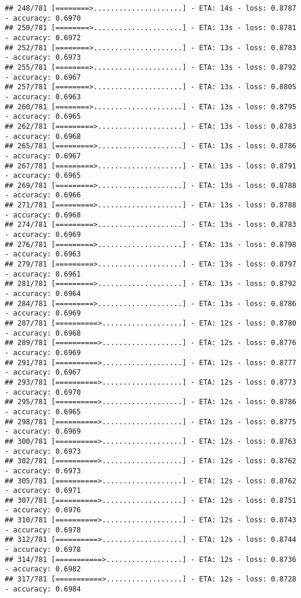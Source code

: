 \documentclass[
]{article}
\begin{document}
\begin{verbatim}
## 248/781 [========>.....................] - ETA: 14s - loss: 0.8787 - accuracy: 0.6970
## 250/781 [========>.....................] - ETA: 13s - loss: 0.8781 - accuracy: 0.6972
## 252/781 [========>.....................] - ETA: 13s - loss: 0.8783 - accuracy: 0.6973
## 255/781 [========>.....................] - ETA: 13s - loss: 0.8792 - accuracy: 0.6967
## 257/781 [========>.....................] - ETA: 13s - loss: 0.8805 - accuracy: 0.6963
## 260/781 [========>.....................] - ETA: 13s - loss: 0.8795 - accuracy: 0.6965
## 262/781 [=========>....................] - ETA: 13s - loss: 0.8783 - accuracy: 0.6968
## 265/781 [=========>....................] - ETA: 13s - loss: 0.8786 - accuracy: 0.6967
## 267/781 [=========>....................] - ETA: 13s - loss: 0.8791 - accuracy: 0.6965
## 269/781 [=========>....................] - ETA: 13s - loss: 0.8788 - accuracy: 0.6966
## 271/781 [=========>....................] - ETA: 13s - loss: 0.8788 - accuracy: 0.6968
## 274/781 [=========>....................] - ETA: 13s - loss: 0.8783 - accuracy: 0.6969
## 276/781 [=========>....................] - ETA: 13s - loss: 0.8798 - accuracy: 0.6963
## 279/781 [=========>....................] - ETA: 13s - loss: 0.8797 - accuracy: 0.6961
## 281/781 [=========>....................] - ETA: 13s - loss: 0.8792 - accuracy: 0.6964
## 284/781 [=========>....................] - ETA: 13s - loss: 0.8786 - accuracy: 0.6969
## 287/781 [==========>...................] - ETA: 12s - loss: 0.8780 - accuracy: 0.6968
## 289/781 [==========>...................] - ETA: 12s - loss: 0.8776 - accuracy: 0.6969
## 291/781 [==========>...................] - ETA: 12s - loss: 0.8777 - accuracy: 0.6967
## 293/781 [==========>...................] - ETA: 12s - loss: 0.8773 - accuracy: 0.6970
## 295/781 [==========>...................] - ETA: 12s - loss: 0.8786 - accuracy: 0.6965
## 298/781 [==========>...................] - ETA: 12s - loss: 0.8775 - accuracy: 0.6969
## 300/781 [==========>...................] - ETA: 12s - loss: 0.8763 - accuracy: 0.6973
## 302/781 [==========>...................] - ETA: 12s - loss: 0.8762 - accuracy: 0.6973
## 305/781 [==========>...................] - ETA: 12s - loss: 0.8762 - accuracy: 0.6971
## 307/781 [==========>...................] - ETA: 12s - loss: 0.8751 - accuracy: 0.6976
## 310/781 [==========>...................] - ETA: 12s - loss: 0.8743 - accuracy: 0.6978
## 312/781 [==========>...................] - ETA: 12s - loss: 0.8744 - accuracy: 0.6978
## 314/781 [===========>..................] - ETA: 12s - loss: 0.8736 - accuracy: 0.6982
## 317/781 [===========>..................] - ETA: 12s - loss: 0.8728 - accuracy: 0.6984

\end{verbatim}
\end{document}
